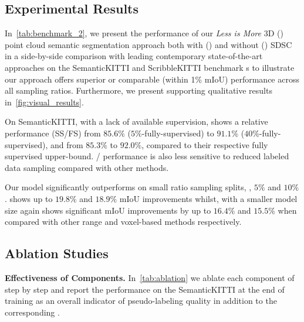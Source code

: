 \documentclass[10pt,twocolumn,letterpaper]{article}
\newcommand\bdtitle[1]{\noindent\textbf{#1}}
\begin{document}
\subsection{Experimental Results}
\vspace{-0.2cm}
\noindent
In~\cref{tab:benchmark_2}, we present the performance of our \textit{Less is More} 3D ({\ourmodel}) point cloud semantic segmentation approach both with ({\ourmodelsdsc}) and without ({\ourmodel}) SDSC in a side-by-side comparison with leading contemporary state-of-the-art approaches on the SemanticKITTI and ScribbleKITTI benchmark {\validset}s to illustrate our approach offers superior or comparable (within 1\% mIoU) performance across all sampling ratios. Furthermore, we present supporting qualitative results in~\cref{fig:visual_results}.

On SemanticKITTI, with a lack of available supervision, {\ourmodel} shows a relative performance (SS/FS) from $85.6\%$ ($5\%$-fully-supervised) to $91.1\%$ ($40\%$-fully-supervised), and {\ourmodelsdsc} from $85.3\%$ to $92.0\%$, compared to their respective fully supervised upper-bound. {\ourmodel}/{\ourmodelsdsc} performance is also less sensitive to reduced labeled data sampling compared with other methods.

Our model significantly outperforms on small ratio sampling splits, \eg, $5\%$ and $10\%$. {\ourmodel} shows up to $19.8\%$ and $18.9\%$ mIoU improvements whilst, with a smaller model size {\ourmodelsdsc} again shows significant mIoU improvements by up to $16.4\%$ and $15.5\%$ when compared with other range and voxel-based methods respectively.




\vspace{-0.15cm}
\subsection{Ablation Studies}
\vspace{-0.15cm}
\bdtitle{Effectiveness of Components.} In~\cref{tab:ablation} we ablate each component of {\ourmodel} step by step and report the performance on the SemanticKITTI {\trainset} at the end of training as an overall indicator of pseudo-labeling quality in addition to the corresponding {\validset}.
\end{document}
